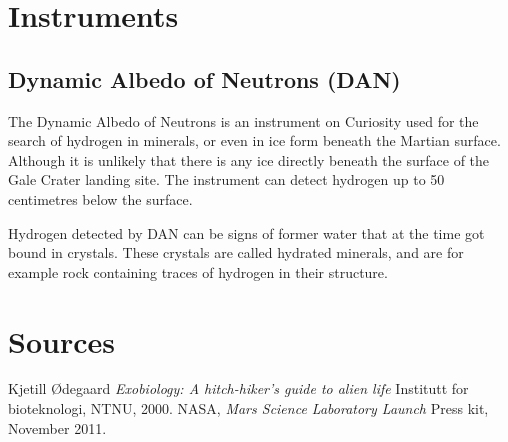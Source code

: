 \documentclass[5p]{elsarticle}
\renewenvironment{abstract}{\global\setbox\absbox=\vbox\bgroup
\hsize=\textwidth\def\baselinestretch{1}%
\noindent\unskip\textbf{Introduction}
\par\medskip\noindent\unskip\ignorespaces}
{\egroup}
\begin{document}

\section*{Instruments}
\subsection*{Dynamic Albedo of Neutrons (DAN)}
The Dynamic Albedo of Neutrons is an instrument on Curiosity used for the search of hydrogen in minerals, or even in ice form beneath the Martian surface.
Although it is unlikely that there is any ice directly beneath the surface of the Gale Crater landing site.
The instrument can detect hydrogen up to 50 centimetres below the surface.

Hydrogen detected by DAN can be signs of former water that at the time got bound in crystals.
These crystals are called hydrated minerals, and are for example rock containing traces of hydrogen in their structure.

\section*{Sources}

\begin{thebibliography}{99}	%
		Kjetill Ødegaard
		\emph{Exobiology: A hitch-hiker's guide to alien life}
		Institutt for bioteknologi,
		NTNU,
		2000.
		NASA,
		\emph{Mars Science Laboratory Launch}
		Press kit,
		November 2011.
\end{thebibliography}
\end{document}
